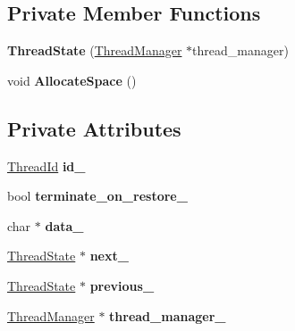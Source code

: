 \subsection*{Private Member Functions}
\begin{DoxyCompactItemize}
\item 
{\bfseries Thread\+State} (\hyperlink{classv8_1_1internal_1_1_thread_manager}{Thread\+Manager} $\ast$thread\+\_\+manager)\hypertarget{classv8_1_1internal_1_1_thread_state_ac4ab63f9eacfc3d337c6e4db599dd39f}{}\label{classv8_1_1internal_1_1_thread_state_ac4ab63f9eacfc3d337c6e4db599dd39f}

\item 
void {\bfseries Allocate\+Space} ()\hypertarget{classv8_1_1internal_1_1_thread_state_a56568601d3edc011a56cc9fd59df70ae}{}\label{classv8_1_1internal_1_1_thread_state_a56568601d3edc011a56cc9fd59df70ae}

\end{DoxyCompactItemize}
\subsection*{Private Attributes}
\begin{DoxyCompactItemize}
\item 
\hyperlink{classv8_1_1internal_1_1_thread_id}{Thread\+Id} {\bfseries id\+\_\+}\hypertarget{classv8_1_1internal_1_1_thread_state_af0d7ec1e5588fa5eec4ebd1ab71e98b8}{}\label{classv8_1_1internal_1_1_thread_state_af0d7ec1e5588fa5eec4ebd1ab71e98b8}

\item 
bool {\bfseries terminate\+\_\+on\+\_\+restore\+\_\+}\hypertarget{classv8_1_1internal_1_1_thread_state_a38d0a3a3f0ba1442b6c92eafe75fcc82}{}\label{classv8_1_1internal_1_1_thread_state_a38d0a3a3f0ba1442b6c92eafe75fcc82}

\item 
char $\ast$ {\bfseries data\+\_\+}\hypertarget{classv8_1_1internal_1_1_thread_state_ada5e4dd6f2c80e4e4aef5ccbbd7a999f}{}\label{classv8_1_1internal_1_1_thread_state_ada5e4dd6f2c80e4e4aef5ccbbd7a999f}

\item 
\hyperlink{classv8_1_1internal_1_1_thread_state}{Thread\+State} $\ast$ {\bfseries next\+\_\+}\hypertarget{classv8_1_1internal_1_1_thread_state_a6e3a17b374e832a7634cd892cd4e9ce0}{}\label{classv8_1_1internal_1_1_thread_state_a6e3a17b374e832a7634cd892cd4e9ce0}

\item 
\hyperlink{classv8_1_1internal_1_1_thread_state}{Thread\+State} $\ast$ {\bfseries previous\+\_\+}\hypertarget{classv8_1_1internal_1_1_thread_state_a35506e67f5503f2c2934361ed8bcd4d2}{}\label{classv8_1_1internal_1_1_thread_state_a35506e67f5503f2c2934361ed8bcd4d2}

\item 
\hyperlink{classv8_1_1internal_1_1_thread_manager}{Thread\+Manager} $\ast$ {\bfseries thread\+\_\+manager\+\_\+}\hypertarget{classv8_1_1internal_1_1_thread_state_ab5b113e820a374a4db02de0e6ae8af2e}{}\label{classv8_1_1internal_1_1_thread_state_ab5b113e820a374a4db02de0e6ae8af2e}

\end{DoxyCompactItemize}
